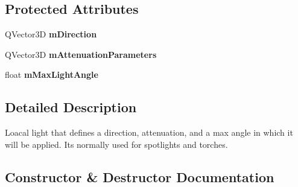 \subsection*{Protected Attributes}
\begin{DoxyCompactItemize}
\item 
\mbox{\label{class_geometry_engine_1_1_geometry_world_item_1_1_geometry_light_1_1_spotlight_add161138d99c9f92491bd19ee69f3301}} 
Q\+Vector3D {\bfseries m\+Direction}
\item 
\mbox{\label{class_geometry_engine_1_1_geometry_world_item_1_1_geometry_light_1_1_spotlight_aade2774067f1bc0c8c751571a8a700e1}} 
Q\+Vector3D {\bfseries m\+Attenuation\+Parameters}
\item 
\mbox{\label{class_geometry_engine_1_1_geometry_world_item_1_1_geometry_light_1_1_spotlight_a57abdc5f5abf4a1537355b85c4c00a80}} 
float {\bfseries m\+Max\+Light\+Angle}
\end{DoxyCompactItemize}


\subsection{Detailed Description}
Loacal light that defines a direction, attenuation, and a max angle in which it will be applied. It\textquotesingle{}s normally used for spotlights and torches. 

\subsection{Constructor \& Destructor Documentation}
\mbox{\label{class_geometry_engine_1_1_geometry_world_item_1_1_geometry_light_1_1_spotlight_ad7bc16302cf245e1f71d8c9af23d3a20}} 

